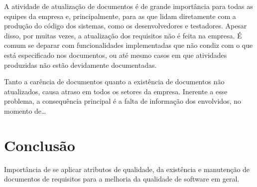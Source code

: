 \documentclass[12pt]{article}
\begin{document}
A atividade de atualização de documentos é de grande importância para todas as equipes 
da empresa e, principalmente, para as que lidam diretamente com a produção do código dos 
sistemas, como os desenvolvedores e testadores. Apesar disso, por muitas vezes, a atualização 
dos requisitos não é feita na empresa. É comum se deparar com funcionalidades implementadas que 
não condiz com o que está especificado nos documentos, ou até mesmo casos em que atividades 
produzidas não estão devidamente documentadas.

Tanto a carência de documentos quanto a existência de documentos não atualizados, causa 
atraso em todos os setores da empresa. Inerente a esse problema, a consequência principal é 
a falta de informação dos envolvidos, no momento de…

\section{Conclusão}

Importância de se aplicar atributos de qualidade, da existência e manutenção de 
documentos de requisitos para a melhoria da qualidade de software em geral.



\end{document}
